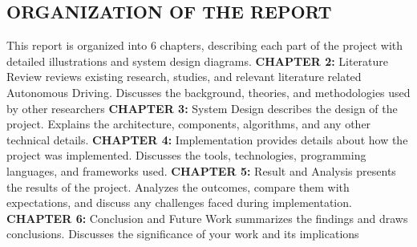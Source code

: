  \begin{spacing}{1.5} 
\begin{sloppypar}
\section{ORGANIZATION OF THE REPORT}

This report is organized into 6 chapters, describing each part of the project with detailed illustrations and system design diagrams. \newline
\textbf{CHAPTER 2:} Literature Review reviews existing research, studies, and relevant literature related Autonomous Driving. Discusses the background, theories, and methodologies used by other researchers\newline 
\textbf{CHAPTER 3:} System Design describes the design of the project. Explains the architecture, components, algorithms, and any other technical details.\newline
\textbf{CHAPTER 4:} Implementation provides details about how the project was implemented. Discusses the tools, technologies, programming languages, and frameworks used.\newline
\textbf{CHAPTER 5:} Result and Analysis presents the results of the project. Analyzes the outcomes, compare them with expectations, and discuss any challenges faced during implementation.\newline
\textbf{CHAPTER 6:} Conclusion and Future Work summarizes the findings and draws conclusions. Discusses the significance of your work and its implications\newline
\end{sloppypar}
 \end{spacing}